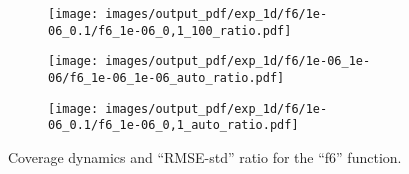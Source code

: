 \documentclass[a4paper,14pt]{extarticle}
\begin{document}
\begin{figure}
  \begin{subfigure}[b]{0.25\linewidth}
    \texttt{[image: images/output\_pdf/exp\_1d/f6/1e-06\_0.1/f6\_1e-06\_0,1\_100\_ratio.pdf]}
    \caption{} \label{fig:f6_1d_low_noise_c2}
  \end{subfigure}%
  \begin{subfigure}[b]{0.25\linewidth}
    \texttt{[image: images/output\_pdf/exp\_1d/f6/1e-06\_1e-06/f6\_1e-06\_1e-06\_auto\_ratio.pdf]}
    \caption{} \label{fig:f6_1d_low_noise_c3}
  \end{subfigure}%
  \begin{subfigure}[b]{0.25\linewidth}
    \texttt{[image: images/output\_pdf/exp\_1d/f6/1e-06\_0.1/f6\_1e-06\_0,1\_auto\_ratio.pdf]}
    \caption{} \label{fig:f6_1d_low_noise_c4}
  \end{subfigure}%
  \caption{Coverage dynamics and ``RMSE-std'' ratio for the ``f6'' function.}
  \label{fig:f6_1d_low_noise}
\end{figure}
\end{document}
